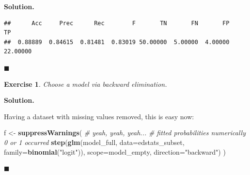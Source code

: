 \documentclass[10pt,b5paper,krantz1]{krantz}
\newenvironment{Shaded}{\begin{snugshade}}{\end{snugshade}}
\newcommand{\CommentTok}[1]{\textcolor[rgb]{0.37,0.37,0.37}{\textit{#1}}}
\newcommand{\DataTypeTok}[1]{\textcolor[rgb]{0.27,0.27,0.27}{#1}}
\newcommand{\KeywordTok}[1]{\textcolor[rgb]{0.27,0.27,0.27}{\textbf{#1}}}
\newcommand{\NormalTok}[1]{#1}
\newcommand{\StringTok}[1]{\textcolor[rgb]{0.5,0.5,0.5}{#1}}
\newtheorem{exercise}{Exercise}[chapter]
\newenvironment{solution}{%
\bigskip\noindent\textbf{Solution. }%
\it\ignorespaces%
\ignorespaces%
}{\ignorespaces%
\hfill$\blacksquare$%
}
\begin{document}
\begin{solution}
\begin{verbatim}
##      Acc     Prec      Rec        F       TN       FN       FP       TP 
##  0.88889  0.84615  0.81481  0.83019 50.00000  5.00000  4.00000 22.00000
\end{verbatim}

\end{solution}

\begin{exercise}

Choose a model via backward elimination.

\end{exercise}

\begin{solution}

Having a dataset with missing values removed, this is easy now:

\begin{Shaded}
\begin{Highlighting}[]
\NormalTok{f <-}\StringTok{ }\KeywordTok{suppressWarnings}\NormalTok{( }\CommentTok{# yeah, yeah, yeah...}
        \CommentTok{# fitted probabilities numerically 0 or 1 occurred}
    \KeywordTok{step}\NormalTok{(}\KeywordTok{glm}\NormalTok{(model_full, }\DataTypeTok{data=}\NormalTok{edstats_subset, }\DataTypeTok{family=}\KeywordTok{binomial}\NormalTok{(}\StringTok{"logit"}\NormalTok{)),}
        \DataTypeTok{scope=}\NormalTok{model_empty, }\DataTypeTok{direction=}\StringTok{"backward"}\NormalTok{)}
\NormalTok{)}
\end{Highlighting}
\end{Shaded}


\end{solution}
\end{document}
